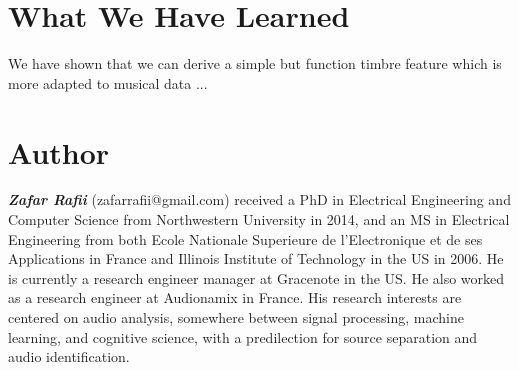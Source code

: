 \documentclass[journal]{IEEEtran}
\begin{document}
\section{What We Have Learned}

We have shown that we can derive a simple but function timbre feature which is more adapted to musical data ...



\section{Author}

\textit{\textbf{Zafar Rafii}} (zafarrafii@gmail.com) received a PhD in Electrical Engineering and Computer Science from Northwestern University in 2014, and an MS in Electrical Engineering from both Ecole Nationale Superieure de l’Electronique et de ses Applications in France and Illinois Institute of Technology in the US in 2006. He is currently a research engineer manager at Gracenote in the US. He also worked as a research engineer at Audionamix in France. His research interests are centered on audio analysis, somewhere between signal processing, machine learning, and cognitive science, with a predilection for source separation and audio identification.



\end{document}
